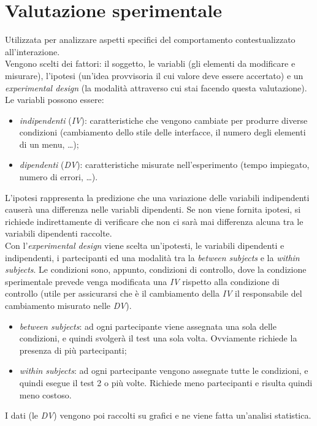 \section{Valutazione sperimentale}
Utilizzata per analizzare aspetti specifici del comportamento contestualizzato all'interazione. \\
Vengono scelti dei fattori: il soggetto, le variabli (gli elementi da modificare e misurare), l'ipotesi (un'idea provvisoria il cui valore deve essere accertato) e un \textit{experimental design} (la modalit\`a attraverso cui stai facendo questa valutazione).
Le variabli possono essere:
\begin{itemize}
	\item \textit{indipendenti} (\textit{IV}): caratteristiche che vengono cambiate per produrre diverse condizioni (cambiamento dello stile delle interfacce, il numero degli elementi di un menu, \ldots);
	\item \textit{dipendenti} (\textit{DV}): caratteristiche misurate nell'esperimento (tempo impiegato, numero di errori, \ldots).
\end{itemize}
L'ipotesi rappresenta la predizione che una variazione delle variabili indipendenti causer\`a una differenza nelle variabli dipendenti. Se non viene fornita ipotesi, si richiede indirettamente di verificare che non ci sar\`a mai differenza alcuna tra le variabili dipendenti raccolte. \\
Con l'\textit{experimental design} viene scelta un'ipotesti, le variabili dipendenti e indipendenti, i partecipanti ed una modalit\`a tra la \textit{between subjects} e la \textit{within subjects}.
Le condizioni sono, appunto, condizioni di controllo, dove la condizione sperimentale prevede venga modificata una \textit{IV} rispetto alla condizione di controllo (utile per assicurarsi che \`e il cambiamento della \textit{IV} il responsabile del cambiamento misurato nelle \textit{DV}).
\begin{itemize}
	\item \textit{between subjects}: ad ogni partecipante viene assegnata una sola delle condizioni, e quindi svolger\`a il test una sola volta. Ovviamente richiede la presenza di pi\`u partecipanti;
	\item \textit{within subjects}: ad ogni partecipante vengono assegnate tutte le condizioni, e quindi esegue il test 2 o pi\`u volte. Richiede meno partecipanti e risulta quindi meno costoso.
\end{itemize}
I dati (le \textit{DV}) vengono poi raccolti su grafici e ne viene fatta un'analisi statistica.

